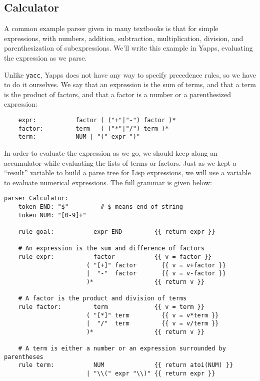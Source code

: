 \documentclass[10pt]{article}
\newcommand{\mysubsection}[1]{\subsection{#1}}
\begin{document}
\mysubsection{Calculator}

A common example parser given in many textbooks is that for simple
expressions, with numbers, addition, subtraction, multiplication,
division, and parenthesization of subexpressions.  We'll write this
example in Yapps, evaluating the expression as we parse.

Unlike \texttt{yacc}, Yapps does not have any way to specify
precedence rules, so we have to do it ourselves.  We say that an
expression is the sum of terms, and that a term is the product of
factors, and that a factor is a number or a parenthesized expression:

\begin{verbatim}
    expr:           factor ( ("+"|"-") factor )*
    factor:         term   ( ("*"|"/") term )*
    term:           NUM | "(" expr ")"
\end{verbatim}

In order to evaluate the expression as we go, we should keep along an
accumulator while evaluating the lists of terms or factors.  Just as
we kept a ``result'' variable to build a parse tree for Lisp
expressions, we will use a variable to evaluate numerical
expressions.  The full grammar is given below:

\begin{verbatim}
parser Calculator:
    token END: "$"         # $ means end of string
    token NUM: "[0-9]+"

    rule goal:           expr END         {{ return expr }}

    # An expression is the sum and difference of factors
    rule expr:           factor           {{ v = factor }}
                       ( "[+]" factor       {{ v = v+factor }}
                       |  "-"  factor       {{ v = v-factor }}
                       )*                 {{ return v }}

    # A factor is the product and division of terms
    rule factor:         term             {{ v = term }}
                       ( "[*]" term         {{ v = v*term }}
                       |  "/"  term         {{ v = v/term }}
                       )*                 {{ return v }}

    # A term is either a number or an expression surrounded by parentheses
    rule term:           NUM              {{ return atoi(NUM) }}
                       | "\\(" expr "\\)" {{ return expr }}
\end{verbatim}
\end{document}
